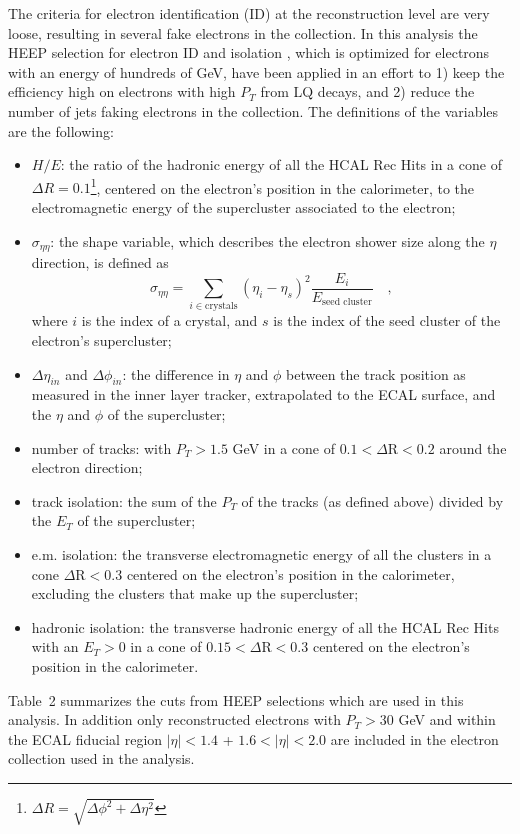 \documentclass{cmspaper}
\begin{document}
\begin{linenumbers}
The criteria for electron identification (ID) at the reconstruction level are very loose, resulting in several fake electrons in the collection. 
In this analysis the HEEP selection for electron ID and isolation \cite{HEEP}, which is optimized for 
electrons with an energy of hundreds of GeV, have been applied in an effort to 1) keep the efficiency high on electrons with high $P_{T}$ from LQ decays, and 
2) reduce the number of jets faking electrons in the collection.
The definitions of the variables are the following:
%
\begin{itemize}
%
\item $H/E$: the ratio of the hadronic energy of all the HCAL Rec Hits in a cone of $\Delta R=0.1$\footnote{$\Delta R = \sqrt{\Delta\phi^2 + \Delta\eta^2}$}, 
centered on the electron's position in the calorimeter, 
to the electromagnetic energy of the supercluster associated to the electron;
%
\item $\sigma_{\eta\eta}$: the shape variable, which describes the electron shower size along the $\eta$ direction, is 
defined as 
\begin{displaymath}
\sigma_{\eta\eta} = \sum_{i \in \mathrm{crystals}} ( \eta_i - \eta_s )^2 \frac{E_i}{E_{\mbox{seed cluster}}} \quad ,
\end{displaymath}
where $i$ is the index of a crystal, and $s$ is the index of the seed cluster of the electron's supercluster;
%
\item $\Delta\eta_{in}$ and $\Delta\phi_{in}$: the difference in $\eta$ and $\phi$ between the track position as 
measured in the inner layer tracker, extrapolated to the ECAL surface, and the $\eta$ and $\phi$ of the supercluster;
%
\item number of tracks: with $P_{T}>1.5$ GeV in a cone of $0.1 < \Delta\mbox{R} < 0.2 $ around the electron direction;
%
\item track isolation: the sum of the $P_{T}$ of the tracks (as defined above) divided by the $E_{T}$ of the supercluster;
%
\item e.m. isolation: the transverse electromagnetic energy of all the clusters in a cone $\Delta\mbox{R} < 0.3$ centered on the 
electron's position in the calorimeter, excluding the clusters that make up the supercluster;
%
\item hadronic isolation: the transverse hadronic energy of all the HCAL Rec Hits with an $E_{T}>0$ in a cone of
$0.15 < \Delta\mbox{R} < 0.3$ centered on the electron's position in the calorimeter. 
%
\end{itemize}
Table~2
summarizes the cuts from HEEP selections which are 
used in this analysis. In addition only reconstructed electrons with $P_{T}>30$ GeV and within the ECAL fiducial region 
$|\eta|<1.4$ + $1.6<|\eta|<2.0$ are included in the electron collection used in the analysis.  


\end{linenumbers}
\end{document}
